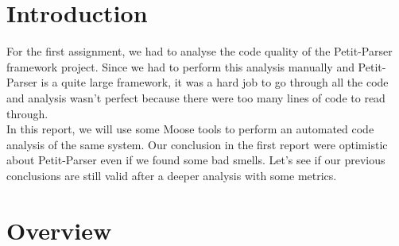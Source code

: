

\usepackage{todonotes}


\set
\section{Introduction}
For the first assignment, we had to analyse the code quality of the Petit-Parser framework project. Since we had to perform this analysis manually and Petit-Parser is a quite large framework, it was a hard job to go through all the code and analysis wasn't perfect because there were too many lines of code to read through. \\
In this report, we will use some Moose tools to perform an automated code analysis of the same system. Our conclusion in the first report were optimistic about Petit-Parser even if we found some bad smells. Let's see if our previous conclusions are still valid after a deeper analysis with some metrics.

\section{Overview}
